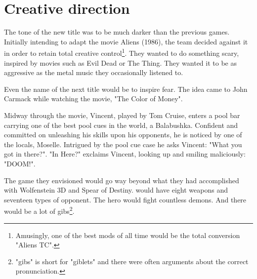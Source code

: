 \section{Creative direction}
The tone of the new title was to be much darker than the previous games. Initially intending to adapt the movie Aliens (1986), the team decided against it in order to retain total creative control\footnote{Amusingly, one of the best mods of all time would be the total conversion "Aliens TC".}. They wanted to do something scary, inspired by movies such as Evil Dead or The Thing. They wanted it to be as aggressive as the metal music they occasionally listened to.\\
\par
Even the name of the next title would be to inspire fear. The idea came to John Carmack while watching the movie, "The Color of Money".\\ 
\par
Midway through the movie, Vincent, played by Tom Cruise, enters a pool bar carrying one of the best pool cues in the world, a Balabushka. Confident and committed on unleashing his skills upon his opponents, he is noticed by one of the locals, Moselle. Intrigued by the pool cue case he asks Vincent: "What you got in there?". "In Here?" exclaims Vincent, looking up and smiling maliciously: "DOOM!".\\
\par

\par
\par
{
\setlength{\abovecaptionskip}{11pt}
}
\par
\vspace{-15pt}
The game they envisioned would go way beyond what they had accomplished with Wolfenstein 3D and Spear of Destiny. \doom{} would have eight weapons and seventeen types of opponent. The hero would fight countless demons. And there would be a lot of gibs\footnote{"gibs" is short for "giblets" and there were often arguments about the correct pronunciation.}.

